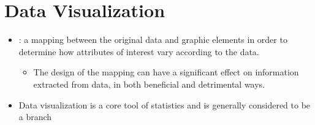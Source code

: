 \section{Data Visualization}
\begin{itemize}
  \item {}: a mapping between the original data and graphic elements in order to determine how attributes of interest vary according to the data.
    \begin{itemize}
      \item The design of the mapping can have a significant effect on information extracted from data, in both beneficial and detrimental ways.
    \end{itemize}
  \item Data visualization is a core tool of statistics and is generally considered to be a branch \hyperref[Chapter: Descriptive Statistics]{}

\end{itemize}
